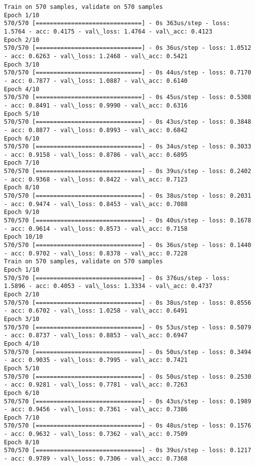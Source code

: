 \documentclass[11pt]{article}
\begin{document}
    \begin{Verbatim}[commandchars=\\\{\}]
Train on 570 samples, validate on 570 samples
Epoch 1/10
570/570 [==============================] - 0s 363us/step - loss: 1.5764 - acc: 0.4175 - val\_loss: 1.4764 - val\_acc: 0.4123
Epoch 2/10
570/570 [==============================] - 0s 36us/step - loss: 1.0512 - acc: 0.6263 - val\_loss: 1.2468 - val\_acc: 0.5421
Epoch 3/10
570/570 [==============================] - 0s 44us/step - loss: 0.7170 - acc: 0.7877 - val\_loss: 1.0887 - val\_acc: 0.6140
Epoch 4/10
570/570 [==============================] - 0s 45us/step - loss: 0.5308 - acc: 0.8491 - val\_loss: 0.9990 - val\_acc: 0.6316
Epoch 5/10
570/570 [==============================] - 0s 43us/step - loss: 0.3848 - acc: 0.8877 - val\_loss: 0.8993 - val\_acc: 0.6842
Epoch 6/10
570/570 [==============================] - 0s 34us/step - loss: 0.3033 - acc: 0.9158 - val\_loss: 0.8786 - val\_acc: 0.6895
Epoch 7/10
570/570 [==============================] - 0s 39us/step - loss: 0.2402 - acc: 0.9368 - val\_loss: 0.8422 - val\_acc: 0.7123
Epoch 8/10
570/570 [==============================] - 0s 38us/step - loss: 0.2031 - acc: 0.9474 - val\_loss: 0.8453 - val\_acc: 0.7088
Epoch 9/10
570/570 [==============================] - 0s 40us/step - loss: 0.1678 - acc: 0.9614 - val\_loss: 0.8573 - val\_acc: 0.7158
Epoch 10/10
570/570 [==============================] - 0s 36us/step - loss: 0.1440 - acc: 0.9702 - val\_loss: 0.8378 - val\_acc: 0.7228
Train on 570 samples, validate on 570 samples
Epoch 1/10
570/570 [==============================] - 0s 376us/step - loss: 1.5896 - acc: 0.4053 - val\_loss: 1.3334 - val\_acc: 0.4737
Epoch 2/10
570/570 [==============================] - 0s 38us/step - loss: 0.8556 - acc: 0.6702 - val\_loss: 1.0258 - val\_acc: 0.6491
Epoch 3/10
570/570 [==============================] - 0s 53us/step - loss: 0.5079 - acc: 0.8737 - val\_loss: 0.8853 - val\_acc: 0.6947
Epoch 4/10
570/570 [==============================] - 0s 50us/step - loss: 0.3494 - acc: 0.9035 - val\_loss: 0.7995 - val\_acc: 0.7421
Epoch 5/10
570/570 [==============================] - 0s 50us/step - loss: 0.2530 - acc: 0.9281 - val\_loss: 0.7781 - val\_acc: 0.7263
Epoch 6/10
570/570 [==============================] - 0s 43us/step - loss: 0.1989 - acc: 0.9456 - val\_loss: 0.7361 - val\_acc: 0.7386
Epoch 7/10
570/570 [==============================] - 0s 48us/step - loss: 0.1576 - acc: 0.9632 - val\_loss: 0.7362 - val\_acc: 0.7509
Epoch 8/10
570/570 [==============================] - 0s 39us/step - loss: 0.1217 - acc: 0.9789 - val\_loss: 0.7306 - val\_acc: 0.7368

\end{Verbatim}
\end{document}
